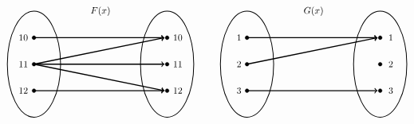 \documentclass[11pt,letterpaper]{article}
\begin{document}
	\[
	\begin{tikzpicture}
	\node at (2.5,2) {$F(x)$};
	
	\draw[line width=0.03cm] (0,0) circle (1 and 2);
	\draw[line width=0.03cm] (5,0) circle (1 and 2);
	
	\draw[fill=black] (0,1) circle (0.07);
	\draw[fill=black] (0,0) circle (0.07);
	\draw[fill=black] (0,-1) circle (0.07);
	
	\draw[fill=black] (5,1) circle (0.07);
	\draw[fill=black] (5,0) circle (0.07);
	\draw[fill=black] (5,-1) circle (0.07);
	
	\draw[line width=0.04cm,->] (0,1) -- (4.9,1);
	\draw[line width=0.04cm,->] (0,0) -- (4.9,1);
	\draw[line width=0.04cm,->] (0,0) -- (4.9,0);
	\draw[line width=0.04cm,->] (0,0) -- (4.9,-1);
	\draw[line width=0.04cm,->] (0,-1) -- (4.9,-1);
	
	\node at (-0.4,1) {$10$};
	\node at (-0.4,0) {$11$};
	\node at (-0.4,-1) {$12$};
	
	\node at (5.4,1) {$10$};
	\node at (5.4,0) {$11$};
	\node at (5.4,-1) {$12$};
	
	\tikzset{shift={(8,0)}}	
	
	\node at (2.5,2) {$G(x)$};
	
	\draw[line width=0.03cm] (0,0) circle (1 and 2);
	\draw[line width=0.03cm] (5,0) circle (1 and 2);
	
	\draw[fill=black] (0,1) circle (0.07);
	\draw[fill=black] (0,0) circle (0.07);
	\draw[fill=black] (0,-1) circle (0.07);
	
	\draw[fill=black] (5,1) circle (0.07);
	\draw[fill=black] (5,0) circle (0.07);
	\draw[fill=black] (5,-1) circle (0.07);
	
	\draw[line width=0.04cm,->] (0,1) -- (4.9,1);
	\draw[line width=0.04cm,->] (0,0) -- (4.9,1);
	\draw[line width=0.04cm,->] (0,-1) -- (4.9,-1);
	
	\node at (-0.3,1) {$1$};
	\node at (-0.3,0) {$2$};
	\node at (-0.3,-1) {$3$};
	
	\node at (5.4,1) {$1$};
	\node at (5.4,0) {$2$};
	\node at (5.4,-1) {$3$};
	\end{tikzpicture}
	\] \pspace
\end{document}
